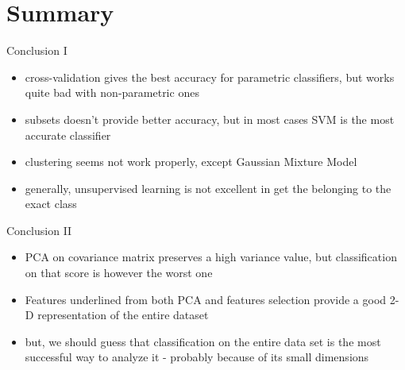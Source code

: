 \documentclass{beamer}
\begin{document}
\section*{Summary}

\begin{frame}{Conclusion I}
  \begin{itemize}
  \item
    \alert{cross-validation} gives the best accuracy for parametric classifiers, but works quite bad with non-parametric ones
  \item
    \alert{subsets} doesn't provide better accuracy, but in most cases SVM is the most accurate classifier
  \item
    \alert{clustering} seems not work properly, except Gaussian Mixture Model
    \item
    generally, \alert{unsupervised learning} is not excellent in get the belonging to the exact class
   \end{itemize}
\end{frame}


\begin{frame}{Conclusion II}
  \begin{itemize}
  \item
    \alert{PCA} on covariance matrix preserves a high variance value, but classification on that score is however the worst one
    \item
    Features underlined from both PCA and features selection provide a good 2-D representation of the entire dataset
    \item
    but, we should guess that \alert{classification on the entire data set} is the most successful way to analyze it - probably because of its small dimensions
   \end{itemize}
\end{frame}




%
%    
%    
%
% 
%    
%
\end{document}
